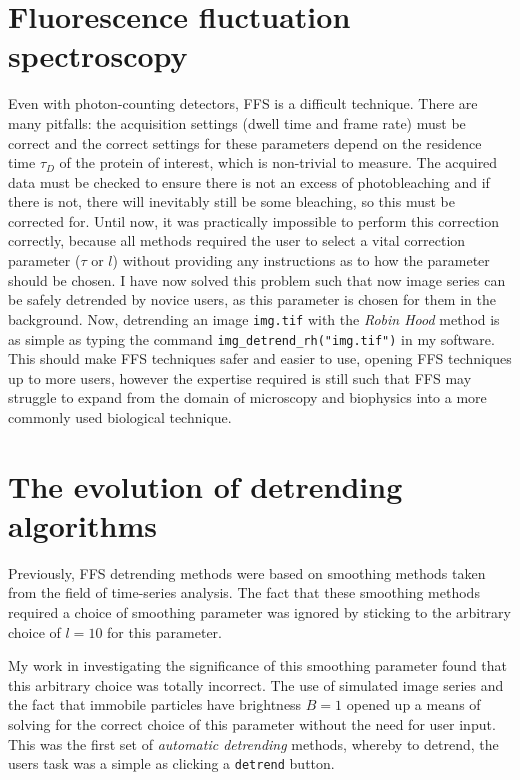 \documentclass[12pt,]{book}
\theoremstyle{definition}
\theoremstyle{definition}
\theoremstyle{definition}
\theoremstyle{remark}
\begin{document}
\section{Fluorescence fluctuation
spectroscopy}\label{fluorescence-fluctuation-spectroscopy}

Even with photon-counting detectors, FFS is a difficult technique. There
are many pitfalls: the acquisition settings (dwell time and frame rate)
must be correct and the correct settings for these parameters depend on
the residence time \(\tau_D\) of the protein of interest, which is
non-trivial to measure. The acquired data must be checked to ensure
there is not an excess of photobleaching and if there is not, there will
inevitably still be some bleaching, so this must be corrected for. Until
now, it was practically impossible to perform this correction correctly,
because all methods required the user to select a vital correction
parameter (\(\tau\) or \(l\)) without providing any instructions as to
how the parameter should be chosen. I have now solved this problem such
that now image series can be safely detrended by novice users, as this
parameter is chosen for them in the background. Now, detrending an image
\texttt{img.tif} with the \emph{Robin Hood} method is as simple as
typing the command \texttt{img\_detrend\_rh("img.tif")} in my software.
This should make FFS techniques safer and easier to use, opening FFS
techniques up to more users, however the expertise required is still
such that FFS may struggle to expand from the domain of microscopy and
biophysics into a more commonly used biological technique.

\section{The evolution of detrending
algorithms}\label{the-evolution-of-detrending-algorithms}

Previously, FFS detrending methods were based on smoothing methods taken
from the field of time-series analysis. The fact that these smoothing
methods required a choice of smoothing parameter was ignored by sticking
to the arbitrary choice of \(l=10\) for this parameter.

My work in investigating the significance of this smoothing parameter
found that this arbitrary choice was totally incorrect. The use of
simulated image series and the fact that immobile particles have
brightness \(B=1\) opened up a means of solving for the correct choice
of this parameter without the need for user input. This was the first
set of \emph{automatic detrending} methods, whereby to detrend, the
users task was a simple as clicking a \texttt{detrend} button.
\end{document}
